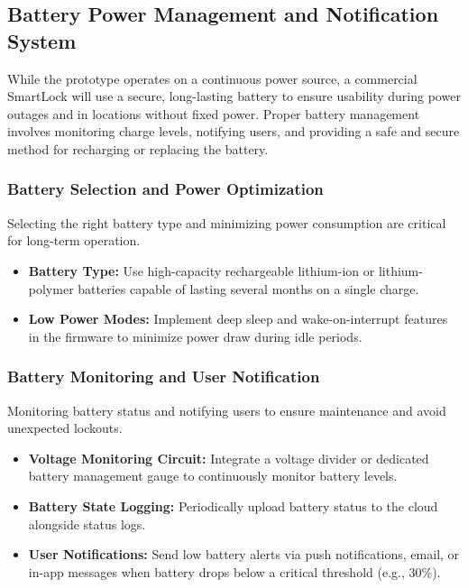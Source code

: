 \newpage
\subsection{Battery Power Management and Notification System}

While the prototype operates on a continuous power source, a commercial SmartLock will use a secure, long-lasting battery to ensure usability during power outages and in locations without fixed power. Proper battery management involves monitoring charge levels, notifying users, and providing a safe and secure method for recharging or replacing the battery.

\subsubsection{Battery Selection and Power Optimization}

Selecting the right battery type and minimizing power consumption are critical for long-term operation.

\begin{itemize}
  \item \textbf{Battery Type:} Use high-capacity rechargeable lithium-ion or lithium-polymer batteries capable of lasting several months on a single charge.
  \item \textbf{Low Power Modes:} Implement deep sleep and wake-on-interrupt features in the firmware to minimize power draw during idle periods.
\end{itemize}

\subsubsection{Battery Monitoring and User Notification}

Monitoring battery status and notifying users to ensure maintenance and avoid unexpected lockouts.

\begin{itemize}
  \item \textbf{Voltage Monitoring Circuit:} Integrate a voltage divider or dedicated battery management gauge to continuously monitor battery levels.
  \item \textbf{Battery State Logging:} Periodically upload battery status to the cloud alongside status logs.
  \item \textbf{User Notifications:} Send low battery alerts via push notifications, email, or in-app messages when battery drops below a critical threshold (e.g., 30\%).
\end{itemize}

